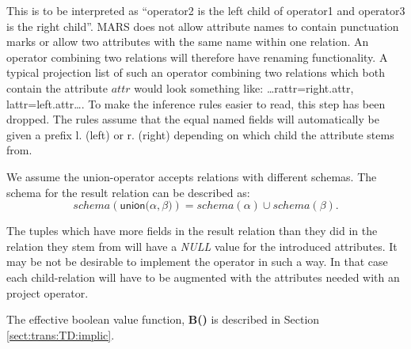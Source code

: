 This is to be interpreted as ``\textsf{operator2} is the left child of \textsf{operator1} and \textsf{operator3} is
the right child''. MARS does not allow attribute names to contain punctuation marks or allow two attributes with the
same name within one relation. An operator combining two relations will therefore have renaming functionality. A
typical projection list of such an operator combining two relations which both contain the attribute $attr$ would
look something like: \textsf{\ldots rattr=right.attr, lattr=left.attr\ldots}. To make the inference rules
easier to read, this step has been dropped. The rules assume that the equal
named fields will automatically be given a prefix \textsf{l.} (left) or
\textsf{r.} (right) depending on which child the attribute stems from.

We assume the \textsf{union}-operator accepts relations with different schemas. The schema for the result
relation can be described as:
\begin{equation*}
schema(\textsf{union(}\alpha, \beta\texttt{)}) = schema(\alpha) \cup schema(\beta).
\end{equation*}

The tuples which have more fields in the result relation than they did in the relation they stem from will
have a \textit{NULL} value for the introduced attributes. It may be not be
desirable to implement the operator in such a way. In that case each
child-relation will have to be augmented with the attributes needed with an
\textsf{project} operator. 

The effective boolean value function, \textbf{B()} is described in Section \ref{sect:trans:TD:implic}. 
